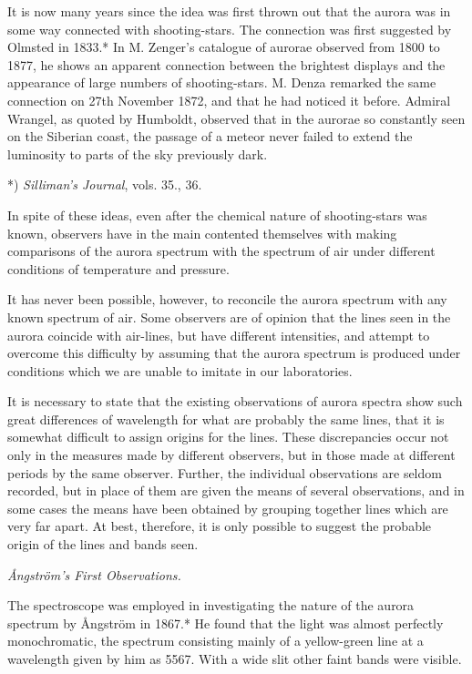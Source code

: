 \documentclass[a4paper, 12pt, oneside, polutonikogreek, english]{article}
\begin{document}
It is now many years since the idea was first thrown out that the aurora was in some way connected with shooting-stars. The connection was first suggested by Olmsted in 1833.* In M. Zenger's catalogue of aurorae observed from 1800 to 1877, he shows an apparent connection between the brightest displays and the appearance of large numbers of shooting-stars. M. Denza remarked the same connection on 27th November 1872, and that he had noticed it before. Admiral Wrangel, as quoted by Humboldt, observed that in the aurorae so constantly seen on the Siberian coast, the passage of a meteor never failed to extend the luminosity to parts of the sky previously dark.

*) \emph{Silliman's Journal}, vols. 35., 36.

In spite of these ideas, even after the chemical nature of shooting-stars was known, observers have in the main contented themselves with making comparisons of the aurora spectrum with the spectrum of air under different conditions of temperature and pressure.

It has never been possible, however, to reconcile the aurora spectrum with any known spectrum of air. Some observers are of opinion that the lines seen in the aurora coincide with air-lines, but have different intensities, and attempt to overcome this difficulty by assuming that the aurora spectrum is produced under conditions which we are unable to imitate in our laboratories.

It is necessary to state that the existing observations of aurora spectra show such great differences of wavelength for what are probably the same lines, that it is somewhat difficult to assign origins for the lines. These discrepancies occur not only in the measures made by different observers, but in those made at different periods by the same observer. Further, the individual observations are seldom recorded, but in place of them are given the means of several observations, and in some cases the means have been obtained by grouping together lines which are very far apart. At best, therefore, it is only possible to suggest the probable origin of the lines and bands seen.

\emph{Ångström's First Observations.}

The spectroscope was employed in investigating the nature of the aurora spectrum by Ångström in 1867.* He found that the light was almost perfectly monochromatic, the spectrum consisting mainly of a yellow-green line at a wavelength given by him as 5567. With a wide slit other faint bands were visible.
\end{document}
